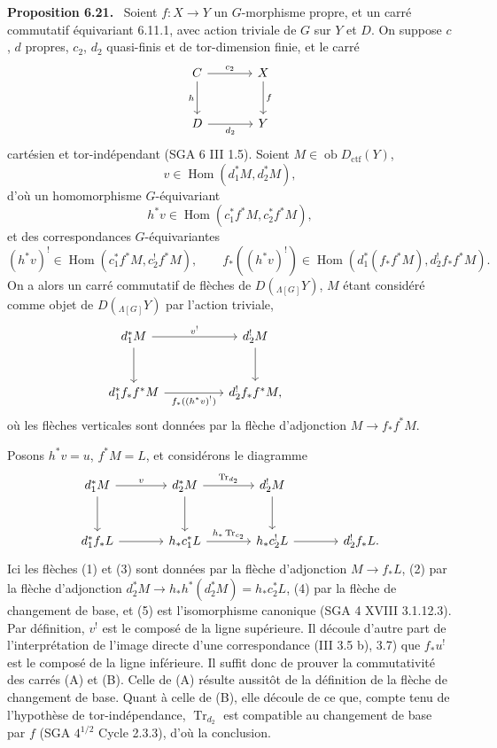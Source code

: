 \documentclass[11pt]{article}
\newenvironment{statement}[1]{\par\medskip\noindent\textbf{#1.}\ }{\par\medskip}
\DeclareMathOperator{\Hom}{Hom}
\providecommand{\Tr}{\operatorname{Tr}}
\providecommand{\Tr}{\operatorname{Tr}}
\providecommand{\Ob}{\operatorname{ob}}
\providecommand{\Tr}{\operatorname{Tr}}
\providecommand{\Hom}{\operatorname{Hom}}
\providecommand{\Ob}{\operatorname{ob}}
\providecommand{\Tr}{\operatorname{Tr}}
\providecommand{\Ob}{\operatorname{Ob}}
\providecommand{\Hom}{\operatorname{Hom}}
\providecommand{\Tr}{\operatorname{Tr}}
\providecommand{\Ob}{\operatorname{ob}}
\providecommand{\Ob}{\operatorname{Ob}}
\begin{document}
\begin{statement}{Proposition 6.21}
Soient $f:X\to Y$ un $G$-morphisme propre, et un carré commutatif équivariant 6.11.1, avec action triviale de $G$ sur $Y$ et $D$. On suppose $c$, $d$ propres, $c_2$, $d_2$ quasi-finis et de tor-dimension finie, et le carré
\[
\begin{tikzcd}[column sep=large,row sep=large]
C \arrow[r,"c_2"] \arrow[d,"h"'] & X \arrow[d,"f"]\\
D \arrow[r,"d_2"'] & Y
\end{tikzcd}
\]
cartésien et tor-indépendant (SGA 6 III 1.5). Soient $M\in\Ob D_{\mathrm{ctf}}(Y)$,
\[
v\in\Hom(d_1^*M,d_2^*M),
\]
d'où un homomorphisme $G$-équivariant
\[
h^*v\in\Hom(c_1^*f^*M,c_2^*f^*M),
\]
et des correspondances $G$-équivariantes
\[
(h^*v)^!\in\Hom(c_1^*f^*M,c_2^!f^*M),
\qquad
f_*((h^*v)^!)\in\Hom(d_1^*(f_*f^*M),d_2^!f_*f^*M).
\]
On a alors un carré commutatif de flèches de $D({}_{\Lambda[G]}Y)$, $M$ étant considéré comme objet de $D({}_{\Lambda[G]}Y)$ par l'action triviale,
\[
\begin{tikzcd}[column sep=huge,row sep=large]
d_1^*M \arrow[r,"v^!"] \arrow[d] & d_2^!M \arrow[d] & {}\\
d_1^*f_*f^*M \arrow[r,"f_*((h^*v)^!)"'] & d_2^!f_*f^*M,
\end{tikzcd}
\]
où les flèches verticales sont données par la flèche d'adjonction $M\to f_*f^*M$.
\end{statement}

Posons $h^*v=u$, $f^*M=L$, et considérons le diagramme
\[
\begin{tikzcd}[column sep=large,row sep=large]
d_1^*M \arrow[r,"v"] \arrow[d] &
d_2^*M \arrow[r,"\Tr_{d_2}"] \arrow[d] &
d_2^!M \arrow[d] & {}\\
d_1^*f_*L \arrow[r] &
h_*c_1^*L \arrow[r,"h_*\Tr_{c_2}"] &
h_*c_2^!L \arrow[r] &
d_2^!f_*L .
\end{tikzcd}
\]
Ici les flèches (1) et (3) sont données par la flèche d'adjonction $M\to f_*L$, (2) par la flèche d'adjonction $d_2^*M\to h_*h^*(d_2^*M)=h_*c_2^*L$, (4) par la flèche de changement de base, et (5) est l'isomorphisme canonique (SGA 4 XVIII 3.1.12.3). Par définition, $v^!$ est le composé de la ligne supérieure. Il découle d'autre part de l'interprétation de l'image directe d'une correspondance (III 3.5 b), 3.7) que $f_*u^!$ est le composé de la ligne inférieure. Il suffit donc de prouver la commutativité des carrés (A) et (B). Celle de (A) résulte aussitôt de la définition de la flèche de changement de base. Quant à celle de (B), elle découle de ce que, compte tenu de l'hypothèse de tor-indépendance, $\Tr_{d_2}$ est compatible au changement de base par $f$ (SGA $4^{1/2}$ Cycle 2.3.3), d'où la conclusion.
\end{document}
